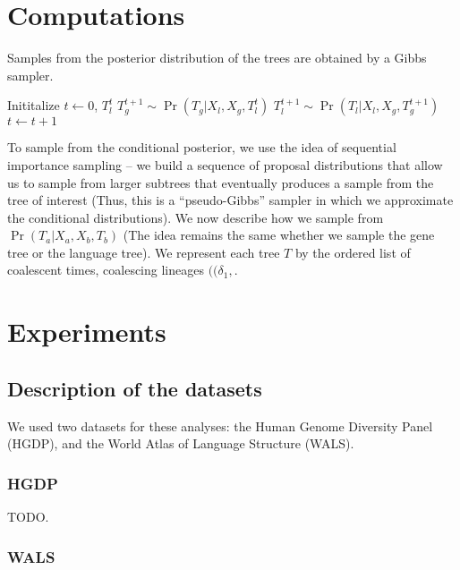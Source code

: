 \documentclass {article}
\begin{document}
\section {Computations}

Samples from the posterior distribution of the trees are obtained by a Gibbs sampler. 
\begin{algorithmic}
\STATE Inititalize $t\leftarrow 0$, $T_l^t$
\STATE $T_g^{t+1}  \sim \Pr (T_g \vert X_l, X_g, T_l^{t}) $
\STATE $T_l^{t+1} \sim \Pr (T_l \vert X_l, X_g, T_g^{t+1})$
\STATE $t \leftarrow t+1$
\ENDWHILE
\end{algorithmic}

To sample from the conditional posterior, we use the idea of sequential importance sampling -- we build a sequence of proposal distributions that allow us to sample 
from larger subtrees that eventually produces a sample from the tree of interest (Thus, this is  a ``pseudo-Gibbs'' sampler in which we approximate the conditional distributions). We now describe how we sample from $\Pr (T_a \vert X_a, X_b, T_b)$ (The idea remains the same whether we sample the gene tree or the language tree). We  represent each tree $T$ by the ordered list of coalescent times, coalescing lineages $( (\delta_1,$. 

\section{Experiments}

\subsection{Description of the datasets}


We used two datasets for these analyses: the Human Genome Diversity Panel (HGDP), and the World Atlas of Language Structure (WALS).

\subsubsection*{HGDP}

TODO.

\subsubsection*{WALS}
\end{document}

